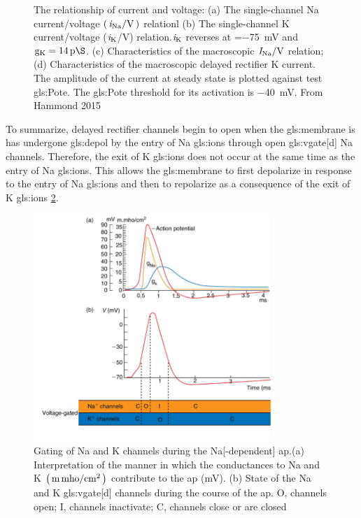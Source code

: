 \documentclass[class={myRUCProject}, crop=false]{standalone}
\begin{document}
\begin{figure}[H]
      \caption{The relationship of current and voltage: (a) The single-channel \gls{Na} current/voltage \(\br{\unit[per-mode = symbol]{\ucur\sodium\per\volt}}\) relationl (b) The single-channel \gls{K} current/voltage (\(\mathit{i}_\mathrm{K}\)/V) relation.\(\mathit{i}_\mathrm{K}\) reverses at =\qty{-75}{\mV} and \(\cond\potassium = \qty{14}{\pico\S}\). (c) Characteristics of the macroscopic \(\curr\sodium/\unit{\V}\) relation; (d) Characteristics of the macroscopic delayed rectifier \gls{K} current. The amplitude of the current at steady state is plotted against test \gls{gls:Pote}. The \gls{gls:Pote} threshold for its activation is \qty{-40}{\mV}. From Hammond 2015 \cite{Hammond2015ch4} }\label{fig:i/I-V}
\end{figure}


To summarize, %
delayed rectifier channels begin to open when the \gls{gls:membrane} is has undergone \gls{gls:depol} by the entry of \gls{Na} \glspl{gls:ion} through open \gls{gls:vgate}[d] \gls{Na} channels. 
Therefore, the exit of \gls{K} \glspl{gls:ion} does not occur at the same time as the entry of \gls{Na} \glspl{gls:ion}. This allows the \gls{gls:membrane} to first depolarize in response to the entry of \gls{Na} \glspl{gls:ion} and then to repolarize as a consequence of the exit of \gls{K} \glspl{gls:ion} \cref{fig:Knumber}.
\begin{figure}[H]
    \centering
    \includegraphics[width=0.8\textwidth]{Pictures//Anakin/N.K.png}
    \caption{Gating of \gls{Na} and \gls{K} channels during the \gls{Na}[-dependent] \gls{ap}.(a) Interpretation of the manner in which the conductances to \gls{Na} and \gls{K} \(\br{\unit{m.mho/cm^2}}\) contribute to the \gls{ap} (\unit{\mV}). (b) State of the \gls{Na} and \gls{K} \gls{gls:vgate}[d] channels during the course of the \gls{ap}. O, channels open; I, channels inactivate; C, channels close or are closed \cite{Hammond2015ch4}}\label{fig:Knumber}
\end{figure}
\end{document}
